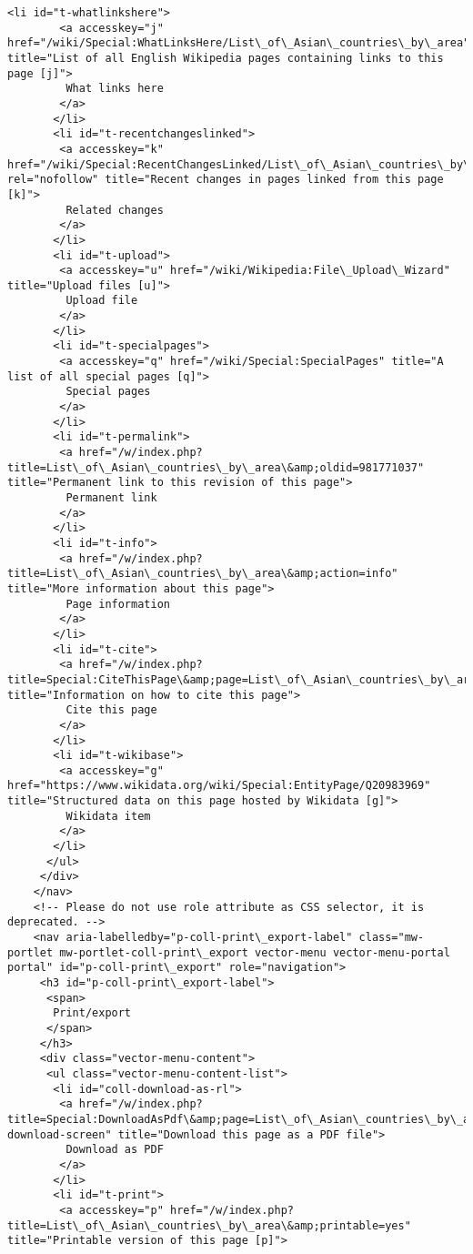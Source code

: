 \documentclass[11pt]{article}
\begin{document}
\begin{Verbatim}[commandchars=\\\{\}]
       <li id="t-whatlinkshere">
        <a accesskey="j" href="/wiki/Special:WhatLinksHere/List\_of\_Asian\_countries\_by\_area" title="List of all English Wikipedia pages containing links to this page [j]">
         What links here
        </a>
       </li>
       <li id="t-recentchangeslinked">
        <a accesskey="k" href="/wiki/Special:RecentChangesLinked/List\_of\_Asian\_countries\_by\_area" rel="nofollow" title="Recent changes in pages linked from this page [k]">
         Related changes
        </a>
       </li>
       <li id="t-upload">
        <a accesskey="u" href="/wiki/Wikipedia:File\_Upload\_Wizard" title="Upload files [u]">
         Upload file
        </a>
       </li>
       <li id="t-specialpages">
        <a accesskey="q" href="/wiki/Special:SpecialPages" title="A list of all special pages [q]">
         Special pages
        </a>
       </li>
       <li id="t-permalink">
        <a href="/w/index.php?title=List\_of\_Asian\_countries\_by\_area\&amp;oldid=981771037" title="Permanent link to this revision of this page">
         Permanent link
        </a>
       </li>
       <li id="t-info">
        <a href="/w/index.php?title=List\_of\_Asian\_countries\_by\_area\&amp;action=info" title="More information about this page">
         Page information
        </a>
       </li>
       <li id="t-cite">
        <a href="/w/index.php?title=Special:CiteThisPage\&amp;page=List\_of\_Asian\_countries\_by\_area\&amp;id=981771037\&amp;wpFormIdentifier=titleform" title="Information on how to cite this page">
         Cite this page
        </a>
       </li>
       <li id="t-wikibase">
        <a accesskey="g" href="https://www.wikidata.org/wiki/Special:EntityPage/Q20983969" title="Structured data on this page hosted by Wikidata [g]">
         Wikidata item
        </a>
       </li>
      </ul>
     </div>
    </nav>
    <!-- Please do not use role attribute as CSS selector, it is deprecated. -->
    <nav aria-labelledby="p-coll-print\_export-label" class="mw-portlet mw-portlet-coll-print\_export vector-menu vector-menu-portal portal" id="p-coll-print\_export" role="navigation">
     <h3 id="p-coll-print\_export-label">
      <span>
       Print/export
      </span>
     </h3>
     <div class="vector-menu-content">
      <ul class="vector-menu-content-list">
       <li id="coll-download-as-rl">
        <a href="/w/index.php?title=Special:DownloadAsPdf\&amp;page=List\_of\_Asian\_countries\_by\_area\&amp;action=show-download-screen" title="Download this page as a PDF file">
         Download as PDF
        </a>
       </li>
       <li id="t-print">
        <a accesskey="p" href="/w/index.php?title=List\_of\_Asian\_countries\_by\_area\&amp;printable=yes" title="Printable version of this page [p]">

\end{Verbatim}
\end{document}
